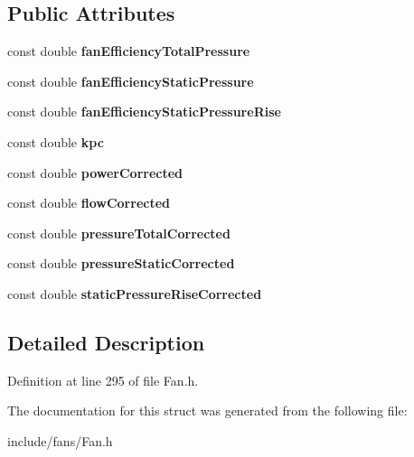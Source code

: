 \subsection*{Public Attributes}
\begin{DoxyCompactItemize}
\item 
\mbox{\label{struct_fan_1_1_fan_results_a919ca8d0193bd8d343ed183c22082153}} 
const double {\bfseries fan\+Efficiency\+Total\+Pressure}
\item 
\mbox{\label{struct_fan_1_1_fan_results_a2b9e352a3c472541319ddb4c09347607}} 
const double {\bfseries fan\+Efficiency\+Static\+Pressure}
\item 
\mbox{\label{struct_fan_1_1_fan_results_a913bbbb883bd019f7fb028ec900aa2d5}} 
const double {\bfseries fan\+Efficiency\+Static\+Pressure\+Rise}
\item 
\mbox{\label{struct_fan_1_1_fan_results_adbd757e5fb41d5f8aa62f2f85dedf898}} 
const double {\bfseries kpc}
\item 
\mbox{\label{struct_fan_1_1_fan_results_ac4fce97933a54066299dfbf185bdde91}} 
const double {\bfseries power\+Corrected}
\item 
\mbox{\label{struct_fan_1_1_fan_results_a32d81936cb9c9563586fdddaaf7304b8}} 
const double {\bfseries flow\+Corrected}
\item 
\mbox{\label{struct_fan_1_1_fan_results_a692f4911644ba2fde5af273f6c89485f}} 
const double {\bfseries pressure\+Total\+Corrected}
\item 
\mbox{\label{struct_fan_1_1_fan_results_aca8c3c458a510e830b4efd25e95eab54}} 
const double {\bfseries pressure\+Static\+Corrected}
\item 
\mbox{\label{struct_fan_1_1_fan_results_a39013554f372d97c7fc9de4804ab4696}} 
const double {\bfseries static\+Pressure\+Rise\+Corrected}
\end{DoxyCompactItemize}


\subsection{Detailed Description}


Definition at line 295 of file Fan.\+h.



The documentation for this struct was generated from the following file\+:\begin{DoxyCompactItemize}
\item 
include/fans/Fan.\+h\end{DoxyCompactItemize}
